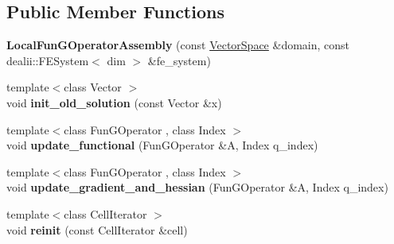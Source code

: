 \subsection*{\-Public \-Member \-Functions}
\begin{DoxyCompactItemize}
\item 
\hypertarget{structSpacy_1_1dealII_1_1Detail_1_1LocalFunGOperatorAssembly_a8f53e50821f8494bd4f5cb2a696aa642}{{\bfseries \-Local\-Fun\-G\-Operator\-Assembly} (const \hyperlink{classSpacy_1_1VectorSpace}{\-Vector\-Space} \&domain, const dealii\-::\-F\-E\-System$<$ dim $>$ \&fe\-\_\-system)}\label{structSpacy_1_1dealII_1_1Detail_1_1LocalFunGOperatorAssembly_a8f53e50821f8494bd4f5cb2a696aa642}

\item 
\hypertarget{structSpacy_1_1dealII_1_1Detail_1_1LocalFunGOperatorAssembly_a22bd8cee3366cdac84f1512802864454}{{\footnotesize template$<$class Vector $>$ }\\void {\bfseries init\-\_\-old\-\_\-solution} (const \-Vector \&x)}\label{structSpacy_1_1dealII_1_1Detail_1_1LocalFunGOperatorAssembly_a22bd8cee3366cdac84f1512802864454}

\item 
\hypertarget{structSpacy_1_1dealII_1_1Detail_1_1LocalFunGOperatorAssembly_a72f1af3092e61811503407474f769d69}{{\footnotesize template$<$class Fun\-G\-Operator , class Index $>$ }\\void {\bfseries update\-\_\-functional} (\-Fun\-G\-Operator \&\-A, \-Index q\-\_\-index)}\label{structSpacy_1_1dealII_1_1Detail_1_1LocalFunGOperatorAssembly_a72f1af3092e61811503407474f769d69}

\item 
\hypertarget{structSpacy_1_1dealII_1_1Detail_1_1LocalFunGOperatorAssembly_a325125699c023099785e2b139181b00b}{{\footnotesize template$<$class Fun\-G\-Operator , class Index $>$ }\\void {\bfseries update\-\_\-gradient\-\_\-and\-\_\-hessian} (\-Fun\-G\-Operator \&\-A, \-Index q\-\_\-index)}\label{structSpacy_1_1dealII_1_1Detail_1_1LocalFunGOperatorAssembly_a325125699c023099785e2b139181b00b}

\item 
\hypertarget{structSpacy_1_1dealII_1_1Detail_1_1LocalAssemblyBase_aa626f61838942e829ecd56bcdf00eb36}{{\footnotesize template$<$class Cell\-Iterator $>$ }\\void {\bfseries reinit} (const \-Cell\-Iterator \&cell)}\label{structSpacy_1_1dealII_1_1Detail_1_1LocalAssemblyBase_aa626f61838942e829ecd56bcdf00eb36}


\end{DoxyCompactItemize}
